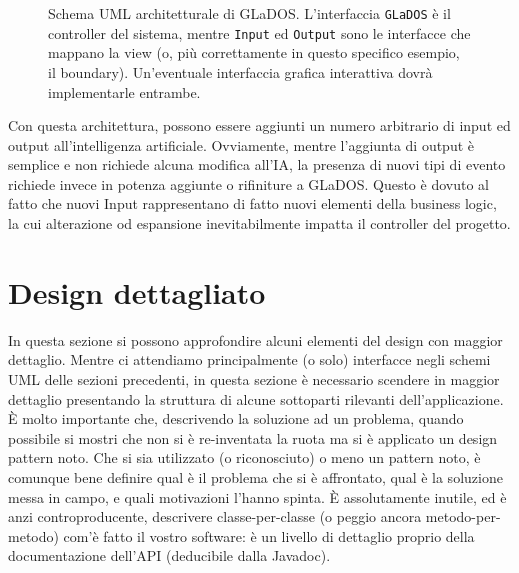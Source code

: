 \documentclass[a4paper,12pt]{report}
\begin{document}
\begin{figure}[h]
\centering{}
\caption{Schema UML architetturale di GLaDOS. L'interfaccia \texttt{GLaDOS} è il controller del sistema, mentre \texttt{Input} ed \texttt{Output} sono le interfacce che mappano la view (o, più correttamente in questo specifico esempio, il boundary). Un'eventuale interfaccia grafica interattiva dovrà implementarle entrambe.}
\label{img:goodarch}
\end{figure}

Con questa architettura, possono essere aggiunti un numero arbitrario di input ed output
all'intelligenza artificiale.
%
Ovviamente, mentre l'aggiunta di output è semplice e non richiede alcuna modifica all'IA, la
presenza di nuovi tipi di evento richiede invece in potenza aggiunte o rifiniture a GLaDOS.
%
Questo è dovuto al fatto che nuovi Input rappresentano di fatto nuovi elementi della business
logic, la cui alterazione od espansione inevitabilmente impatta il controller del progetto.



\section{Design dettagliato}

In questa sezione si possono approfondire alcuni elementi del design con maggior dettaglio.
%
Mentre ci attendiamo principalmente (o solo) interfacce negli schemi UML delle sezioni precedenti,
in questa sezione è necessario scendere in maggior dettaglio presentando la struttura di alcune sottoparti rilevanti dell'applicazione.
%
È molto importante che, descrivendo la soluzione ad un problema, quando possibile si mostri che non si è re-inventata la ruota ma si è applicato un design pattern noto.
%
Che si sia utilizzato (o riconosciuto) o meno un pattern noto, è comunque bene definire qual è il problema che si è affrontato, qual è la soluzione messa in campo, e quali motivazioni l'hanno spinta.
%
È assolutamente inutile, ed è anzi controproducente, descrivere classe-per-classe (o peggio ancora metodo-per-metodo) com'è fatto il vostro software: è un livello di dettaglio proprio della documentazione dell'API (deducibile dalla Javadoc).
\end{document}

